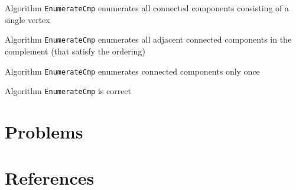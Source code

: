 \documentclass[11pt]{article}
\begin{document}
\begin{lemma}[]
Algorithm \texttt{EnumerateCmp} enumerates all connected components consisting of a single vertex
\end{lemma}

\begin{lemma}[]
Algorithm \texttt{EnumerateCmp} enumerates all adjacent connected components in the complement (that satisfy
the ordering)
\end{lemma}

\begin{lemma}[]
Algorithm \texttt{EnumerateCmp} enumerates connected components only once
\end{lemma}

\begin{theorem}[]
Algorithm \texttt{EnumerateCmp} is correct
\end{theorem}
\section{Problems}
\label{sec:org63fe12a}


\section{References}
\label{sec:org2f87942}
\label{bibliographystyle link}



\end{document}
